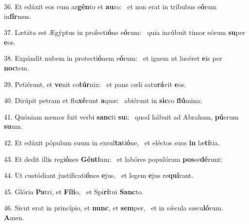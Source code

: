 36. Et edúxit eos cum ar\textbf{gén}to et \textbf{au}ro: \ast\  et non erat in tríbubus e\textbf{ó}rum in\textbf{fír}mus.\

37. Lætáta est Ægýptus in profecti\textbf{ó}ne e\textbf{ó}rum: \ast\  quia incúbuit timor eórum \textbf{su}per \textbf{e}os.\

38. Expándit nubem in protecti\textbf{ó}nem e\textbf{ó}rum: \ast\  et ignem ut lucéret \textbf{e}is per \textbf{noc}tem.\

39. Petiérunt, et \textbf{ve}nit co\textbf{túr}nix: \ast\  et pane cæli satu\textbf{rá}vit \textbf{e}os.\

40. Dirúpit petram et flu\textbf{xé}runt \textbf{a}quæ: \ast\  abiérunt in \textbf{sic}co \textbf{flú}mina;\

41. Quóniam memor fuit verbi \textbf{sanc}ti \textbf{su}i: \ast\  quod hábuit ad Abraham, \textbf{pú}erum \textbf{su}um.\

42. Et edúxit pópulum suum in exsul\textbf{ta}ti\textbf{ó}ne, \ast\  et eléctos suos \textbf{in} læ\textbf{tí}tia.\

43. Et dedit illis regi\textbf{ó}nes \textbf{Gén}\textbf{ti}um: \ast\  et labóres populórum \textbf{pos}se\textbf{dé}runt:\

44. Ut custódiant justificati\textbf{ó}nes \textbf{e}jus, \ast\  et legem \textbf{e}jus re\textbf{quí}rant.\

45. Glória \textbf{Pa}tri, et \textbf{Fí}\textbf{li}o, \ast\  et Spi\textbf{rí}tui \textbf{Sanc}to.\

46. Sicut erat in princípio, et \textbf{nunc}, et \textbf{sem}per, \ast\  et in sǽcula sæcu\textbf{ló}rum. \textbf{A}men.\

